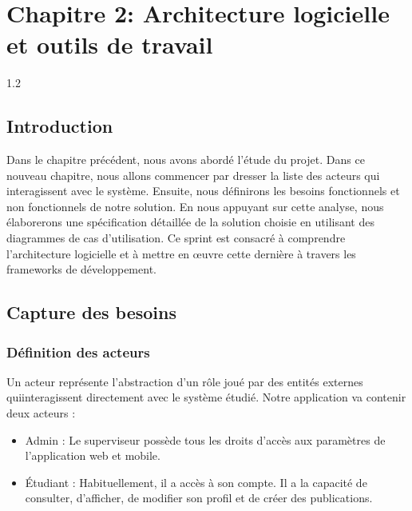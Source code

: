 \chapter{ Chapitre 2: Architecture 
\centering logicielle et outils de travail}
\begin{spacing}{1.2}
\minitoc
\thispagestyle{MyStyle}
\end{spacing}
\newpage
\begin{sloppypar} 

\section{Introduction}
\vspace{-3mm}
Dans le chapitre précédent, nous avons abordé l’étude du projet. Dans ce nouveau chapitre, nous allons commencer par dresser la liste des acteurs qui interagissent avec le système. Ensuite, nous définirons les besoins fonctionnels et non fonctionnels de notre solution. En nous appuyant sur cette analyse, nous élaborerons une spécification détaillée de la solution choisie en utilisant des diagrammes de cas d’utilisation. Ce sprint est consacré à comprendre l’architecture logicielle et à mettre en œuvre cette dernière à travers les frameworks de développement.
\vspace{-9mm}
\section{Capture des besoins}
\vspace{-4mm}
\subsection{Définition des acteurs }
\vspace{-3mm}
Un acteur représente l’abstraction d’un rôle joué par des entités externes quiinteragissent
directement avec le système étudié. Notre application va contenir deux acteurs :

\begin{itemize}
    \item[$\bullet$] Admin : Le superviseur possède tous les droits d'accès aux paramètres de l'application web et mobile.
    \item[$\bullet$] Étudiant : Habituellement, il a accès à son compte. Il a la capacité de consulter, d'afficher, de modifier son profil et de créer des publications.
\end{itemize}
\vspace{-9mm}


\end{sloppypar}
